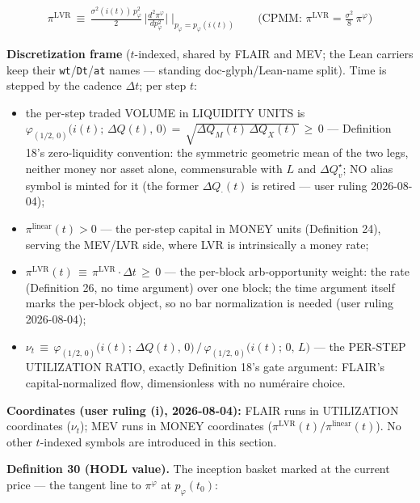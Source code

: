 \documentclass[11pt]{article}
\providecommand{\tightlist}{\setlength{\itemsep}{0pt}\setlength{\parskip}{0pt}}
\renewcommand{\_}{\textunderscore\allowbreak}
\begin{document}
\[
    \begin{aligned}
        \pi^{\mathrm{LVR}} \, \equiv \, \frac{\sigma^2(i(t))\, p_{\varphi}^2}{2}\,\Big|\frac{d^2\pi^{\varphi}}{dp_{\varphi}^2}\Big|\;\Big|_{p_{\varphi} = p_{\varphi}(i(t))} \qquad \big(\text{CPMM: } \pi^{\mathrm{LVR}} = \tfrac{\sigma^2}{8}\,\pi^{\varphi}\big)
    \end{aligned}
\]

\textbf{Discretization frame} (\(t\)-indexed, shared by FLAIR and MEV; the Lean carriers keep their \texttt{w\_t}/\allowbreak\texttt{D\_t}/\allowbreak\texttt{a\_t} names --- standing doc-glyph/Lean-name split). Time is stepped by the cadence \(\Delta t\); per step \(t\):

\begin{itemize}
\tightlist
\item
  the per-step traded VOLUME in LIQUIDITY UNITS is \(\varphi_{(1/2,\,0)}\big(i(t);\, \Delta Q(t),\, 0\big) \, = \, \sqrt{\Delta Q_M(t)\,\Delta Q_X(t)} \, \geq \, 0\) --- Definition 18's zero-liquidity convention: the symmetric geometric mean of the two legs, neither money nor asset alone, commensurable with \(L\) and \(\Delta Q_v^{\star}\); NO alias symbol is minted for it (the former \(\Delta Q_{\cdot}(t)\) is retired --- user ruling 2026-08-04);
\item
  \(\pi^{\text{linear}}(t) > 0\) --- the per-step capital in MONEY units (Definition 24), serving the MEV/LVR side, where LVR is intrinsically a money rate;
\item
  \(\pi^{\mathrm{LVR}}(t) \, \equiv \, \pi^{\mathrm{LVR}}\cdot\Delta t \, \geq \, 0\) --- the per-block arb-opportunity weight: the rate (Definition 26, no time argument) over one block; the time argument itself marks the per-block object, so no bar normalization is needed (user ruling 2026-08-04);
\item
  \(\nu_t \, \equiv \, \varphi_{(1/2,\,0)}\big(i(t);\, \Delta Q(t),\, 0\big)\,\big/\,\varphi_{(1/2,\,0)}\big(i(t);\, 0,\, L\big)\) --- the PER-STEP UTILIZATION RATIO, exactly Definition 18's gate argument: FLAIR's capital-normalized flow, dimensionless with no numéraire choice.
\end{itemize}

\textbf{Coordinates (user ruling (i), 2026-08-04):} FLAIR runs in UTILIZATION coordinates (\(\nu_t\)); MEV runs in MONEY coordinates (\(\pi^{\mathrm{LVR}}(t)/\pi^{\text{linear}}(t)\)). No other \(t\)-indexed symbols are introduced in this section.

\textbf{Definition 30 (HODL value).} The inception basket marked at the current price --- the tangent line to \(\pi^{\varphi}\) at \(p_{\varphi}(t_0)\):
\end{document}
